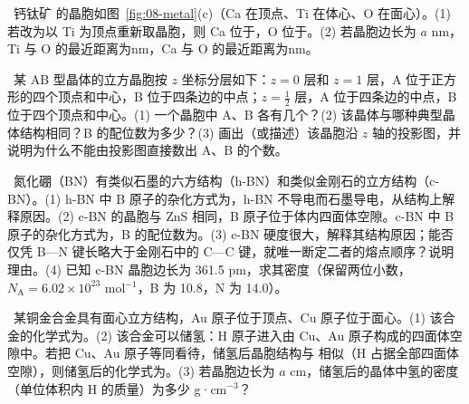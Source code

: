 \begin{xiti}
\item {}\ 钙钛矿  的晶胞如图~\ref{fig:08-metal}(c)（Ca 在顶点、Ti 在体心、O 在面心）。(1) 若改为以 Ti 为顶点重新取晶胞，则 Ca 位于\tk，O 位于\tk。(2) 若晶胞边长为 $a$ nm，Ti 与 O 的最近距离为\tk nm，Ca 与 O 的最近距离为\tk nm。

\item {}\ 某 AB 型晶体的立方晶胞按 $z$ 坐标分层如下：$z=0$ 层和 $z=1$ 层，A 位于正方形的四个顶点和中心，B 位于四条边的中点；$z=\frac12$ 层，A 位于四条边的中点，B 位于四个顶点和中心。(1) 一个晶胞中 A、B 各有几个？(2) 该晶体与哪种典型晶体结构相同？B 的配位数为多少？(3) 画出（或描述）该晶胞沿 $z$ 轴的投影图，并说明为什么不能由投影图直接数出 A、B 的个数。
\end{xiti}

\begin{xiti}
\item {}\ 氮化硼（BN）有类似石墨的六方结构（h-BN）和类似金刚石的立方结构（c-BN）。(1) h-BN 中 B 原子的杂化方式为\tk，h-BN 不导电而石墨导电，从结构上解释原因。(2) c-BN 的晶胞与 ZnS 相同，B 原子位于体内四面体空隙。c-BN 中 B 原子的杂化方式为\tk，B 的配位数为\tk。(3) c-BN 硬度很大，解释其结构原因；能否仅凭 B—N 键长略大于金刚石中的 C—C 键，就唯一断定二者的熔点顺序？说明理由。(4) 已知 c-BN 晶胞边长为 361.5 pm，求其密度（保留两位小数，$N_\text{A}=6.02\times10^{23}$ mol$^{-1}$，B 为 10.8，N 为 14.0）。

\item {}\ 某铜金合金具有面心立方结构，Au 原子位于顶点、Cu 原子位于面心。(1) 该合金的化学式为\tk。(2) 该合金可以储氢：H 原子进入由 Cu、Au 原子构成的四面体空隙中。若把 Cu、Au 原子等同看待，储氢后晶胞结构与  相似（H 占据全部四面体空隙），则储氢后的化学式为\tk。(3) 若晶胞边长为 $a$ cm，储氢后的晶体中氢的密度（单位体积内 H 的质量）为多少 g·cm$^{-3}$？
\end{xiti}

